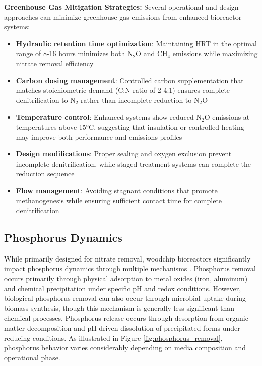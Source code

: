 \documentclass[12pt,a4paper]{article}
\begin{document}
\textbf{Greenhouse Gas Mitigation Strategies:}
Several operational and design approaches can minimize greenhouse gas emissions from enhanced bioreactor systems:

\begin{itemize}
\item \textbf{Hydraulic retention time optimization}: Maintaining HRT in the optimal range of 8-16 hours minimizes both N$_{2}$O and CH$_{4}$ emissions while maximizing nitrate removal efficiency \citep{RN1181}
\item \textbf{Carbon dosing management}: Controlled carbon supplementation that matches stoichiometric demand (C:N ratio of 2-4:1) ensures complete denitrification to N$_{2}$ rather than incomplete reduction to N$_{2}$O \citep{RN632}
\item \textbf{Temperature control}: Enhanced systems show reduced N$_{2}$O emissions at temperatures above 15°C, suggesting that insulation or controlled heating may improve both performance and emissions profiles \citep{RN228}
\item \textbf{Design modifications}: Proper sealing and oxygen exclusion prevent incomplete denitrification, while staged treatment systems can complete the reduction sequence \citep{RN1181}
\item \textbf{Flow management}: Avoiding stagnant conditions that promote methanogenesis while ensuring sufficient contact time for complete denitrification \citep{RN1181}
\end{itemize}

\subsection{Phosphorus Dynamics}

While primarily designed for nitrate removal, woodchip bioreactors significantly impact phosphorus dynamics through multiple mechanisms \citep{RN370, RN291}. Phosphorus removal occurs primarily through physical adsorption to metal oxides (iron, aluminum) and chemical precipitation under specific pH and redox conditions. However, biological phosphorus removal can also occur through microbial uptake during biomass synthesis, though this mechanism is generally less significant than chemical processes. Phosphorus release occurs through desorption from organic matter decomposition and pH-driven dissolution of precipitated forms under reducing conditions. As illustrated in Figure \ref{fig:phosphorus_removal}, phosphorus behavior varies considerably depending on media composition and operational phase.
\end{document}
